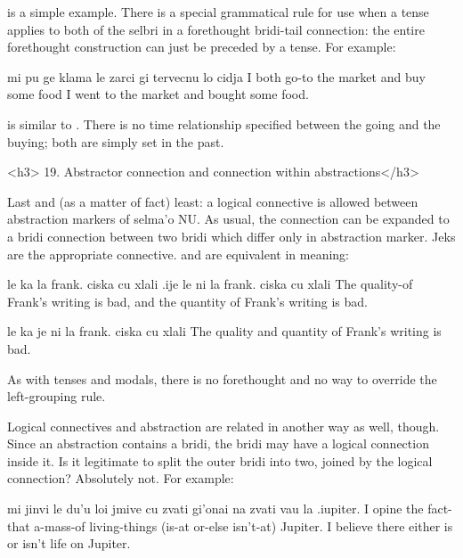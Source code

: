 {\noindent}is a simple example. There is a special grammatical rule for
    use when a tense applies to both of the selbri in a forethought
    bridi-tail connection: the entire forethought construction can
    just be preceded by a tense. For example:
\begin{example}
mi pu ge klama le zarci gi tervecnu lo cidja\n
I  both go-to the market and buy some food\n
I went to the market and bought some food.
\end{example}

 is similar to . There is no time relationship
    specified between the going and the buying; both are simply set
    in the past. 

<h3>
19. Abstractor connection and connection within
    abstractions</h3>

Last and (as a matter of fact) least: a logical connective
    is allowed between abstraction markers of selma'o NU. As usual,
    the connection can be expanded to a bridi connection between
    two bridi which differ only in abstraction marker. Jeks are the
    appropriate connective.  and
     are equivalent in
    meaning:
\begin{example}
le ka la frank. ciska cu xlali\n
\T	.ije le ni la frank. ciska cu xlali\n
The quality-of Frank's writing is bad,\n
\T	and the quantity of Frank's writing is bad.
\end{example}

\begin{example}
le ka je ni la frank. ciska cu xlali\n
The quality and quantity of Frank's writing is bad.
\end{example}

As with tenses and modals, there is no forethought and no way
    to override the left-grouping rule. 

Logical connectives and abstraction are related in another
    way as well, though. Since an abstraction contains a bridi, the
    bridi may have a logical connection inside it. Is it legitimate
    to split the outer bridi into two, joined by the logical
    connection? Absolutely not. For example:
\begin{example}
mi jinvi le du'u loi jmive cu zvati\n
\T	gi'onai na zvati vau la .iupiter.\n
I opine the fact-that a-mass-of living-things (is-at\n
\T	or-else isn't-at) Jupiter.\n
I believe there either is or isn't life on Jupiter.
\end{example}

